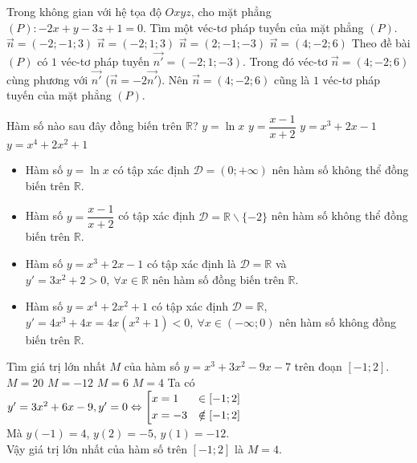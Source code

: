 \begin{ex}%
	Trong không gian với hệ tọa độ $ Oxyz $, cho mặt phẳng $(P)\colon -2x+y-3z+1=0$. Tìm một véc-tơ pháp tuyến của mặt phẳng $(P)$.
	\choice
	{$\vec{n}=(-2;-1;3)$}
	{$\vec{n}=(-2;1;3)$}
	{$\vec{n}=(2;-1;-3)$}
	{\True $\vec{n}=(4;-2;6)$}
	\loigiai
	{Theo đề bài $(P)$ có $ 1 $ véc-tơ pháp tuyến $\vec{n'}=(-2;1;-3)$. Trong đó véc-tơ $\vec{n}=(4;-2;6)$ cùng phương với $\vec{n'}$ ($ \vec{n} = -2 \vec{n'} $). Nên $\vec{n}=(4;-2;6)  $ cũng là $ 1 $ véc-tơ pháp tuyến của mặt phẳng $ (P) $.
	}
\end{ex}
\begin{ex}%
	Hàm số nào sau đây đồng biến trên $\mathbb{R}$?
	\choice
	{$y=\ln x$}
	{$y=\dfrac{x-1}{x+2}$}
	{\True $y=x^3+2x-1$}
	{$y=x^4+2x^2+1$}
	\loigiai
	{\begin{itemize}
			\item Hàm số $y=\ln x$ có tập xác định $\mathscr{D}=(0;+\infty)$ nên hàm số không thể đồng biến trên $\mathbb{R}$.
			\item Hàm số $y=\dfrac{x-1}{x+2}$ có tập xác định $\mathscr{D}=\mathbb{R}\backslash\{-2\}$ nên hàm số không thể đồng biến trên $\mathbb{R}$.
			\item Hàm số $y=x^3+2x-1$ có tập xác định là $\mathscr{D}=\mathbb{R}$ và $y'=3x^2+2>0, \ \forall x\in\mathbb{R}$ nên hàm số đồng biến trên $\mathbb{R}$.
			\item Hàm số $y=x^4+2x^2+1$ có tập xác định $\mathscr{D}=\mathbb{R}$, $y'=4x^3+4x=4x(x^2+1)<0, \ \forall x\in(-\infty;0)$ nên hàm số không đồng biến trên $\mathbb{R}$.
		\end{itemize}
}
\end{ex}
\begin{ex}%
	Tìm giá trị lớn nhất $M$ của hàm số $y=x^3+3x^2-9x-7$ trên đoạn $\left[-1;2\right]$.
	\choice
	{$M=20$}
	{$M=-12$}
	{$M=6$}
	{\True $M=4$}
	\loigiai
	{
		Ta có $y'=3x^2+6x-9, y'=0 \Leftrightarrow  \left[\begin{aligned}&x=1 &\in[-1;2]\\ &x=-3 &\notin [-1;2]\end{aligned}\right.$ \\
		Mà $y(-1)=4$, $y(2)=-5$, $y(1)=-12$. \\
		Vậy giá trị lớn nhất của hàm số trên $\left[-1;2\right]$ là $M=4$.
	}
\end{ex}
